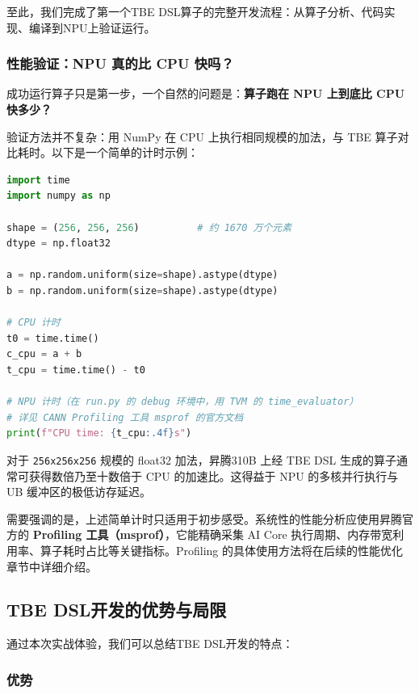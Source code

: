 至此，我们完成了第一个TBE
DSL算子的完整开发流程：从算子分析、代码实现、编译到NPU上验证运行。

\subsubsection{性能验证：NPU 真的比 CPU
快吗？}\label{src-book-chapter7-h29}

成功运行算子只是第一步，一个自然的问题是：\textbf{算子跑在 NPU 上到底比
CPU 快多少？}

验证方法并不复杂：用 NumPy 在 CPU 上执行相同规模的加法，与 TBE
算子对比耗时。以下是一个简单的计时示例：

\begin{lstlisting}[language=Python]
import time
import numpy as np

shape = (256, 256, 256)          # 约 1670 万个元素
dtype = np.float32

a = np.random.uniform(size=shape).astype(dtype)
b = np.random.uniform(size=shape).astype(dtype)

# CPU 计时
t0 = time.time()
c_cpu = a + b
t_cpu = time.time() - t0

# NPU 计时（在 run.py 的 debug 环境中，用 TVM 的 time_evaluator）
# 详见 CANN Profiling 工具 msprof 的官方文档
print(f"CPU time: {t_cpu:.4f}s")
\end{lstlisting}

对于 \passthrough{\lstinline!256x256x256!} 规模的 float32 加法，昇腾310B
上经 TBE DSL 生成的算子通常可获得数倍乃至十数倍于 CPU 的加速比。这得益于
NPU 的多核并行执行与 UB 缓冲区的极低访存延迟。

需要强调的是，上述简单计时只适用于初步感受。系统性的性能分析应使用昇腾官方的
\textbf{Profiling 工具（msprof）}，它能精确采集 AI Core
执行周期、内存带宽利用率、算子耗时占比等关键指标。Profiling
的具体使用方法将在后续的性能优化章节中详细介绍。

\subsection{TBE DSL开发的优势与局限}\label{src-book-chapter7-h30}

通过本次实战体验，我们可以总结TBE DSL开发的特点：

\subsubsection{优势}\label{src-book-chapter7-h31}

